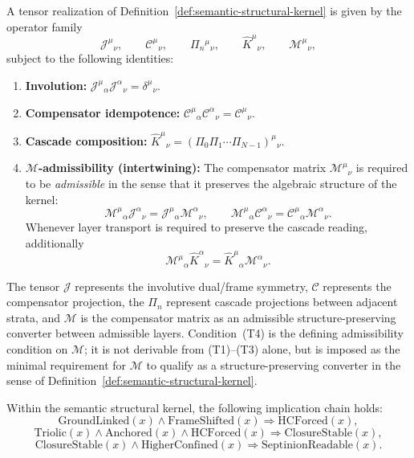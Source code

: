 \begin{definition}
\label{def:tensor-structural-kernel}
A tensor realization of Definition~\ref{def:semantic-structural-kernel}
is given by the operator family
\[
\mathcal J^\mu{}_{\nu},\qquad
\mathcal C^\mu{}_{\nu},\qquad
\Pi_n{}^\mu{}_{\nu},\qquad
\hat K^\mu{}_{\nu},\qquad
\mathcal M^\mu{}_{\nu},
\]
subject to the following identities:
\begin{enumerate}[label=(T\arabic*)]
 \item \textbf{Involution:}
 $\mathcal J^\mu{}_{\alpha}\mathcal J^\alpha{}_{\nu}=\delta^\mu{}_{\nu}$.
 \item \textbf{Compensator idempotence:}
 $\mathcal C^\mu{}_{\alpha}\mathcal C^\alpha{}_{\nu}=\mathcal C^\mu{}_{\nu}$.
 \item \textbf{Cascade composition:}
 $\hat K^\mu{}_{\nu}=(\Pi_0\Pi_1\cdots\Pi_{N-1})^\mu{}_{\nu}$.
 \item \textbf{$\mathcal M$-admissibility (intertwining):}
 The compensator matrix $\mathcal M^\mu{}_{\nu}$ is required to be
 \emph{admissible} in the sense that it preserves the algebraic
 structure of the kernel:
 \[
 \mathcal M^\mu{}_{\alpha}\mathcal J^\alpha{}_{\nu}
 =\mathcal J^\mu{}_{\alpha}\mathcal M^\alpha{}_{\nu},
 \qquad
 \mathcal M^\mu{}_{\alpha}\mathcal C^\alpha{}_{\nu}
 =\mathcal C^\mu{}_{\alpha}\mathcal M^\alpha{}_{\nu}.
 \]
 Whenever layer transport is required to preserve the cascade reading,
 additionally
 \[
 \mathcal M^\mu{}_{\alpha}\hat K^\alpha{}_{\nu}
 =\hat K^\mu{}_{\alpha}\mathcal M^\alpha{}_{\nu}.
 \]
\end{enumerate}
The tensor $\mathcal J$ represents the involutive dual/frame symmetry,
$\mathcal C$ represents the compensator projection, the $\Pi_n$ represent
cascade projections between adjacent strata, and $\mathcal M$ is the
compensator matrix as an admissible structure-preserving converter between
admissible layers. Condition~(T4) is the defining admissibility condition
on $\mathcal M$; it is not derivable from (T1)--(T3) alone, but is imposed
as the minimal requirement for $\mathcal M$ to qualify as a
structure-preserving converter in the sense of
Definition~\ref{def:semantic-structural-kernel}.
\end{definition}

\begin{proposition}
\label{prop:semantic-forcing-chain}
Within the semantic structural kernel, the following implication chain holds:
\[
\mathrm{GroundLinked}(x)\wedge \mathrm{FrameShifted}(x)
\Longrightarrow \mathrm{HCForced}(x),
\]
\[
\mathrm{Triolic}(x)\wedge \mathrm{Anchored}(x)\wedge \mathrm{HCForced}(x)
\Longrightarrow \mathrm{ClosureStable}(x),
\]
\[
\mathrm{ClosureStable}(x)\wedge \mathrm{HigherConfined}(x)
\Longrightarrow \mathrm{SeptinionReadable}(x).
\]
\end{proposition}


